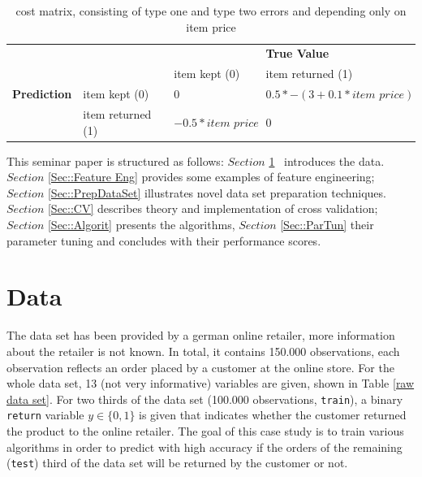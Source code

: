 \documentclass[a4paper,12pt]{article}
\begin{document}
\begin{table}[h]
 \begin{tabular}{l  l | l l}
  & & & \textbf{True Value} \\
  & & item kept (0) & item returned (1) \\
  \hline
  \textbf{Prediction} & item kept (0) & 0 & $0.5*-(3+0.1*\textit{item price})$ \\
  & item returned (1) & $-0.5 * \textit{item price}$ & 0 
 \end{tabular}
 \caption{cost matrix, consisting of type one and type two errors and depending only on item price}
 \label{cost matrix}
\end{table}

\newpage

This seminar paper is structured as follows: $Section$ \ref{Sec::Data} \  introduces the data. $Section$ \ref{Sec::Feature Eng} provides some examples of feature engineering; $Section$ \ref{Sec::PrepDataSet} illustrates novel data set preparation techniques. $Section$ \ref{Sec::CV} describes theory and implementation of cross validation; $Section$ \ref{Sec::Algorit} presents the algorithms, $Section$ \ref{Sec::ParTun} their parameter tuning and concludes with their performance scores.

\section{Data}\label{Sec::Data}
The data set has been provided by a german online retailer, more information about the retailer is not known. In total, it contains 150.000 observations, each observation reflects an order placed by a customer at the online store. For the whole data set, 13 (not very informative) variables are given, shown in Table \ref{raw data set}. For two thirds of the data set (100.000 observations, \texttt{train}), a binary \texttt{return} variable $y \in \{0,1\}$ is given that indicates whether the customer returned the product to the online retailer. The goal of this case study is to train various algorithms in order to predict with high accuracy if the orders of the remaining (\texttt{test}) third of the data set will be returned by the customer or not. 
\end{document}
